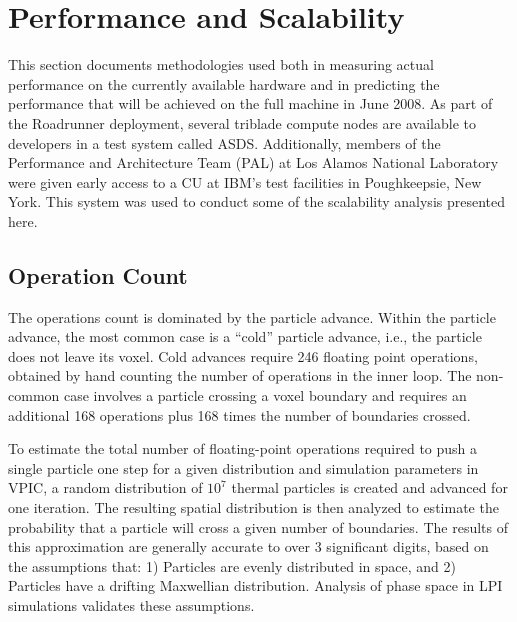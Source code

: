 \documentclass[journal,twoside]{IEEEtran}
\begin{document}
\section{Performance and Scalability} \label{sec:performance}

This section documents methodologies used both in measuring actual
performance on the currently available hardware and in predicting the
performance that will be achieved on the full machine in June 2008.
As part of the Roadrunner deployment, several triblade compute nodes
are available to developers in a test system called ASDS.
Additionally, members of the Performance and Architecture Team (PAL)
at Los Alamos National Laboratory were given early access to a CU at
IBM's test facilities in Poughkeepsie, New York.  This system was used
to conduct some of the scalability analysis presented here.

\subsection{Operation Count}

The operations count is dominated by the particle advance.  Within the
particle advance, the most common case is a ``cold'' particle advance,
i.e., the particle does not leave its voxel.  Cold advances require
246 floating point operations, obtained by hand counting the number of
operations in the inner loop.  The non-common case involves a particle
crossing a voxel boundary and requires an additional 168 operations
plus 168 times the number of boundaries crossed.

To estimate the total number of floating-point operations required to
push a single particle one step for a given distribution and
simulation parameters in VPIC, a random distribution of $10^7$ thermal
particles is created and advanced for one iteration.  The resulting
spatial distribution is then analyzed to estimate the probability that
a particle will cross a given number of boundaries.  The results of
this approximation are generally accurate to over 3 significant
digits, based on the assumptions that: 1) Particles are evenly
distributed in space, and 2) Particles have a drifting Maxwellian
distribution.  Analysis of phase space in LPI simulations validates
these assumptions.~\cite{Yin_et_al_Phys_Plasmas_2007_SRS}
\end{document}
